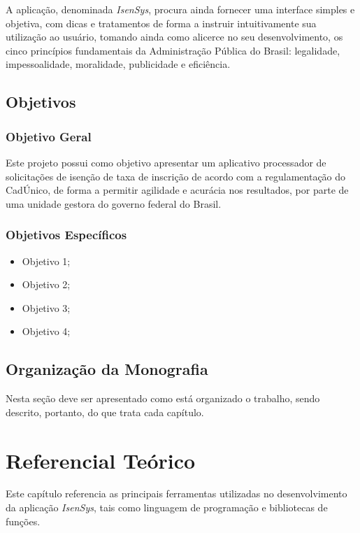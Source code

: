 \documentclass[
	12pt,			%
	openright,		%
	oneside,	
	a4paper,		%
	english,		%
	brazil			%
]{abntex2/abntex2}  %
\begin{document}
	A aplicação, denominada \textit{IsenSys}, procura ainda fornecer uma interface simples e objetiva, com dicas e tratamentos de forma a instruir intuitivamente sua utilização ao usuário, tomando ainda como alicerce no seu desenvolvimento, os cinco princípios fundamentais da Administração Pública do Brasil: legalidade, impessoalidade, moralidade, publicidade e eficiência.

	\section{Objetivos}
	
		\subsection{Objetivo Geral}
		
		Este projeto possui como objetivo apresentar um aplicativo processador de solicitações de isenção de taxa de inscrição de acordo com a regulamentação do CadÚnico, de forma a permitir agilidade e acurácia nos resultados, por parte de uma unidade gestora do governo federal do Brasil.
		
		\subsection{Objetivos Específicos}
		
		\begin{itemize}
			
			\item Objetivo 1;
			\item Objetivo 2;
			\item Objetivo 3;
			\item Objetivo 4;
			
		\end{itemize}
		
	\section{Organização da Monografia}
	
		Nesta seção deve ser apresentado como está organizado o trabalho, sendo descrito, portanto, do que trata cada capítulo.


\chapter{Referencial Teórico}

	Este capítulo referencia as principais ferramentas utilizadas no desenvolvimento da aplicação \textit{IsenSys}, tais como linguagem de programação e bibliotecas de funções.
	
\end{document}
